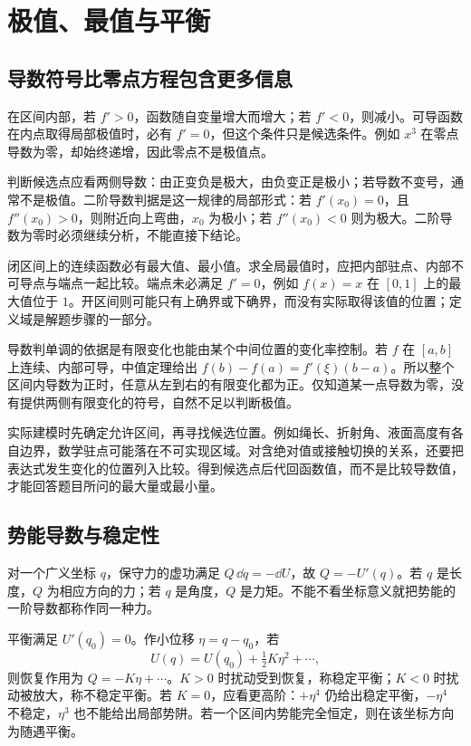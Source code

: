 \section{极值、最值与平衡}
\subsection{导数符号比零点方程包含更多信息}
在区间内部，若 $f'>0$，函数随自变量增大而增大；若 $f'<0$，则减小。可导函数在内点取得局部极值时，必有 $f'=0$，但这个条件只是候选条件。例如 $x^3$ 在零点导数为零，却始终递增，因此零点不是极值点。

判断候选点应看两侧导数：由正变负是极大，由负变正是极小；若导数不变号，通常不是极值。二阶导数判据是这一规律的局部形式：若 $f'(x_0)=0$，且 $f''(x_0)>0$，则附近向上弯曲，$x_0$ 为极小；若 $f''(x_0)<0$ 则为极大。二阶导数为零时必须继续分析，不能直接下结论。

闭区间上的连续函数必有最大值、最小值。求全局最值时，应把内部驻点、内部不可导点与端点一起比较。端点未必满足 $f'=0$，例如 $f(x)=x$ 在 $[0,1]$ 上的最大值位于 $1$。开区间则可能只有上确界或下确界，而没有实际取得该值的位置；定义域是解题步骤的一部分。

导数判单调的依据是有限变化也能由某个中间位置的变化率控制。若 $f$ 在 $[a,b]$ 上连续、内部可导，中值定理给出 $f(b)-f(a)=f'(\xi)(b-a)$。所以整个区间内导数为正时，任意从左到右的有限变化都为正。仅知道某一点导数为零，没有提供两侧有限变化的符号，自然不足以判断极值。

实际建模时先确定允许区间，再寻找候选位置。例如绳长、折射角、液面高度有各自边界，数学驻点可能落在不可实现区域。对含绝对值或接触切换的关系，还要把表达式发生变化的位置列入比较。得到候选点后代回函数值，而不是比较导数值，才能回答题目所问的最大量或最小量。



\subsection{势能导数与稳定性}
对一个广义坐标 $q$，保守力的虚功满足 $Q\,\dd q=-\dd U$，故 $Q=-U'(q)$。若 $q$ 是长度，$Q$ 为相应方向的力；若 $q$ 是角度，$Q$ 是力矩。不能不看坐标意义就把势能的一阶导数都称作同一种力。

平衡满足 $U'(q_0)=0$。作小位移 $\eta=q-q_0$，若
\[
 U(q)=U(q_0)+\tfrac12K\eta^2+\cdots,
\]
则恢复作用为 $Q=-K\eta+\cdots$。$K>0$ 时扰动受到恢复，称稳定平衡；$K<0$ 时扰动被放大，称不稳定平衡。若 $K=0$，应看更高阶：$+\eta^4$ 仍给出稳定平衡，$-\eta^4$ 不稳定，$\eta^3$ 也不能给出局部势阱。若一个区间内势能完全恒定，则在该坐标方向为随遇平衡。


